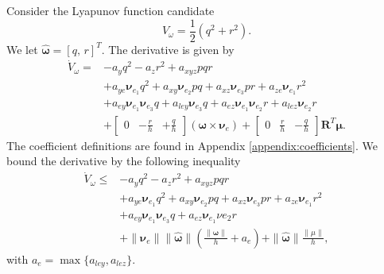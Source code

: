 Consider the Lyapunov function candidate
\begin{equation}
    V_\omega = \frac{1}{2}(q^2 + r^2).
\end{equation}
We let $\hat{\bm{\omega}} = [q, \, r]^T$. The derivative is given by
\begin{equation}\label{eq:interal_lyapunov_dot}
    \begin{split}
        \dot{V}_\omega = &-a_y q^2 - a_z r^2 + a_{xyz}pqr\\
        &+ a_{ye}\bm{\nu}_{e_1} q^2+ a_{xy} \bm{\nu}_{e_2} pq + a_{xz}\bm{\nu}_{e_3} pr + a_{ze} \bm{\nu}_{e_1}r^2\\
        &+a_{ey} \bm{\nu}_{e_1}\bm{\nu}_{e_3}q+ a_{ley}\bm{\nu}_{e_3}q+ a_{ez}\bm{\nu}_{e_1}\bm{\nu}_{e_2}r + a_{lez} \bm{\nu}_{e_2}r\\
        &+\begin{bmatrix}
            0& -\tfrac{r}{h} & +\tfrac{q}{h}
        \end{bmatrix} (\bm{\omega} \times \bm{\nu}_e)+ \begin{bmatrix}
            0& \tfrac{r}{h} & -\tfrac{q}{h}
        \end{bmatrix}\mathbf{R}^T \bm{\mu} . 
    \end{split}
\end{equation}
The coefficient definitions are found in Appendix \ref{appendix:coefficients}. We bound the derivative by the following inequality
    \begin{equation}\label{eq:internal_lyapunov_bound}
    \begin{split}
        \dot{V}_\omega \leq &-a_y q^2 - a_z r^2 + a_{xyz}pqr\\
        &+ a_{ye}\bm{\nu}_{e_1} q^2 + a_{xy} \bm{\nu}_{e_2} pq + a_{xz}\bm{\nu}_{e_3} pr + a_{ze} \bm{\nu}_{e_1}r^2\\
        &+a_{ey} \bm{\nu}_{e_1}\bm{\nu}_{e_3}q+ a_{ez}\bm{\nu}_{e_1}\nu{e_2}r\\
        &+\|\bm{\nu}_e \| \|\hat{\bm{\omega}} \| \left(\frac{\|\bm{\omega}\|}{h} + a_e \right) + \| \hat{\bm{\omega}}\| \frac{\|\mu\|}{h},
    \end{split}
\end{equation}
with $a_e =\max \{a_{ley}, a_{lez}\}$.

